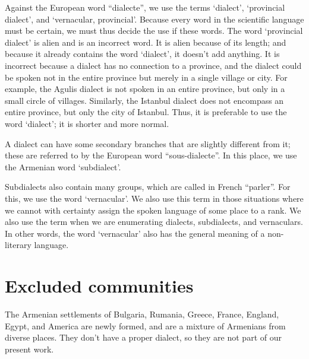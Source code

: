 Against the European word ``dialecte'', we use the terms  `dialect',  `provincial dialect', and  `vernacular, provincial'. Because every word in the scientific language must be certain, we must thus decide the  use if these words. The word  `provincial dialect' is alien and is an incorrect word. It is alien because of its length; and because it already contains the word  `dialect', it doesn't add anything. It is incorrect because a dialect has no connection to a province, and the dialect could be spoken not in the entire province but merely in a single village or city. For example, the Agulis dialect is not spoken in an entire province, but only in a small circle of villages. Similarly, the Istanbul dialect does not encompass an entire province, but only the city of Istanbul. Thus, it is preferable to use the word  `dialect'; it is shorter and more normal. 

A dialect can have some secondary branches that are slightly different from it; these are referred to by the European word ``sous-dialecte''. In this place, we use the Armenian word  `subdialect'. 

Subdialects also contain many groups, which are called in French ``parler''. For this, we use the word  `vernacular'. We also use this term in those situations where we cannot with certainty assign the spoken language of some place to a rank. We also use the term when we are enumerating dialects, subdialects, and vernaculars. In other words, the word  `vernacular' also has the general meaning of a non-literary language. 


\section{Excluded communities}\label{sec:Branches:excluded}


The Armenian settlements of Bulgaria, Rumania, Greece, France, England, Egypt, and America are newly formed, and are a mixture of Armenians from diverse places. They don't have a proper dialect, so they are not part of our present work. 


